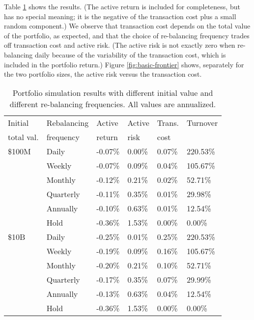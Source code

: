\documentclass[openany]{now}
\begin{document}
Table \ref{tab:basic_example} shows the results.
(The active return is included for completeness,
but has no special meaning; it is the negative of the transaction
cost plus a small random component.)
We observe that transaction cost depends on the total value of
the portfolio, as expected,
and that the choice of re-balancing frequency trades off
transaction cost and active risk.
(The active risk is not exactly zero when
re-balancing daily because of the
variability of the transaction cost, which
is included in the portfolio return.)
Figure \ref{fig:basic-frontier} shows,
separately for the two portfolio sizes,
the active risk versus the transaction cost.

\begin{table}
\begin{center}
\begin{tabular}{ll|llll}
\toprule
Initial    & Rebalancing    & Active  &  Active  &Trans.& Turnover  \\
total val.   & frequency    &  return &  risk&  cost& \\
\midrule
\$100M & Daily &        -0.07\% &       0.00\% &        0.07\% &  220.53\% \\
    & Weekly &        -0.07\% &       0.09\% &        0.04\% &  105.67\% \\
    & Monthly &        -0.12\% &       0.21\% &        0.02\% &   52.71\% \\
    & Quarterly &        -0.11\% &       0.35\% &        0.01\% &   29.98\% \\
    & Annually &        -0.10\% &       0.63\% &        0.01\% &   12.54\% \\
    & Hold &        -0.36\% &       1.53\% &        0.00\% &    0.00\% \\
\$10B & Daily &        -0.25\% &       0.01\% &        0.25\% &  220.53\% \\
    & Weekly &        -0.19\% &       0.09\% &        0.16\% &  105.67\% \\
    & Monthly &        -0.20\% &       0.21\% &        0.10\% &   52.71\% \\
    & Quarterly &        -0.17\% &       0.35\% &        0.07\% &   29.99\% \\
    & Annually &        -0.13\% &       0.63\% &        0.04\% &   12.54\% \\
    & Hold &        -0.36\% &       1.53\% &        0.00\% &    0.00\% \\
\bottomrule
\end{tabular}
\end{center}
\caption{Portfolio simulation results with different initial value
and different re-balancing frequencies. All values are annualized.}
\label{tab:basic_example}
\end{table}
\end{document}
